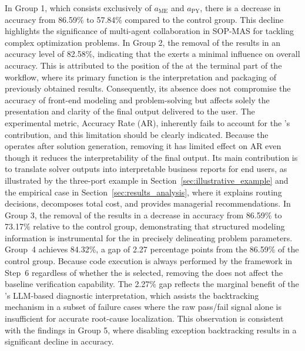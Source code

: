 \documentclass[preprint,12pt]{elsarticle}
\begin{document}
In Group 1, which consists exclusively of $a_{\text{ME}}$ and $a_{\text{PY}}$, there is a decrease in accuracy from 86.59\% to 57.84\% compared to the control group. This decline highlights the significance of multi-agent collaboration in SOP-MAS for tackling complex optimization problems. In Group 2, the removal of the  results in an accuracy level of 82.58\%, indicating that the  exerts a minimal influence on overall accuracy. This is attributed to the position of the  at the terminal part of the workflow, where its primary function is the interpretation and packaging of previously obtained results. Consequently, its absence does not compromise the accuracy of front-end modeling and problem-solving but affects solely the presentation and clarity of the final output delivered to the user. The experimental metric, Accuracy Rate (AR), inherently fails to account for the 's contribution, and this limitation should be clearly indicated. Because the  operates after solution generation, removing it has limited effect on AR even though it reduces the interpretability of the final output. Its main contribution is to translate solver outputs into interpretable business reports for end users, as illustrated by the three-port example in Section~\ref{sec:illustrative_example} and the empirical case in Section~\ref{sec:results_analysis}, where it explains routing decisions, decomposes total cost, and provides managerial recommendations. In Group 3, the removal of the  results in a decrease in accuracy from 86.59\% to 73.17\% relative to the control group, demonstrating that structured modeling information is instrumental for the  in precisely delineating problem parameters. Group~4 achieves 84.32\%, a gap of 2.27 percentage points from the 86.59\% of the control group. Because code execution is always performed by the framework in Step~6 regardless of whether the  is selected, removing the  does not affect the baseline verification capability. The 2.27\% gap reflects the marginal benefit of the 's LLM-based diagnostic interpretation, which assists the backtracking mechanism in a subset of failure cases where the raw pass/fail signal alone is insufficient for accurate root-cause localization. This observation is consistent with the findings in Group 5, where disabling exception backtracking results in a significant decline in accuracy.
\end{document}
